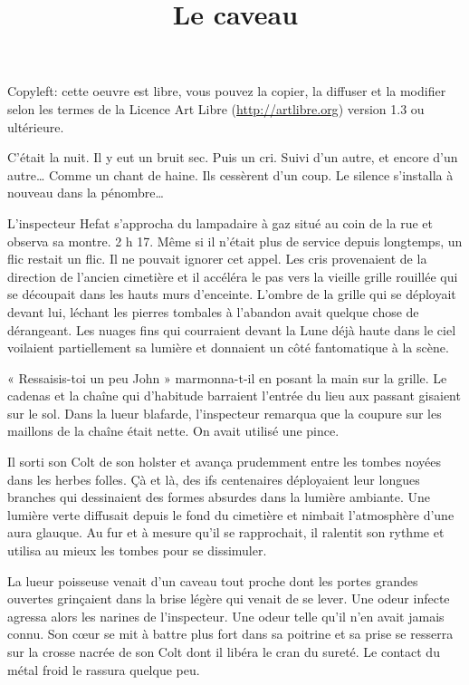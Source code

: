\documentclass[12pt,a4paper,oneside]{memoir}
\title{Le caveau}
\date{}
\begin{document}
\maketitle



\vspace{\baselineskip}
Copyleft: cette oeuvre est libre, vous pouvez la copier, la diffuser et la modifier selon les termes de la Licence Art 
Libre (\url{http://artlibre.org}) version 1.3 ou ultérieure.
\thispagestyle{empty}

\mainmatter
C'était la nuit. Il y eut un bruit sec. Puis un cri. Suivi d'un autre, et encore d'un autre… Comme un chant de haine. 
Ils cessèrent d'un coup. Le silence s'installa à nouveau dans la pénombre…

L'inspecteur Hefat s'approcha du lampadaire à gaz situé au coin de la rue et observa sa montre. 2 h 17. Même si il 
n'était plus de service depuis longtemps, un flic restait un flic. Il ne pouvait ignorer cet appel. Les cris 
provenaient de la direction de l'ancien cimetière et il accéléra le pas vers la vieille grille rouillée qui se 
découpait 
dans les hauts murs d'enceinte. L'ombre de la grille qui se déployait devant lui, léchant les pierres tombales à 
l'abandon avait quelque chose de dérangeant. Les nuages fins qui courraient devant la Lune déjà haute dans le ciel 
voilaient partiellement sa lumière et donnaient un côté fantomatique à la scène.

« Ressaisis-toi un peu John » marmonna-t-il en posant la main sur la grille. Le cadenas et la chaîne qui d'habitude 
barraient l'entrée du lieu aux passant gisaient sur le sol. Dans la lueur blafarde, l'inspecteur remarqua que la 
coupure sur les maillons de la chaîne était nette. On avait utilisé une pince.

Il sorti son Colt de son holster et avança prudemment entre les tombes noyées dans les herbes folles. Çà et là, des ifs 
centenaires déployaient leur longues branches qui dessinaient des formes absurdes dans la lumière ambiante. Une lumière 
verte diffusait depuis le fond du cimetière et nimbait l'atmosphère d'une aura glauque. Au fur et à mesure qu'il se 
rapprochait, il ralentit son rythme et utilisa au mieux les tombes pour se dissimuler.

La lueur poisseuse venait d'un caveau tout proche dont les portes grandes ouvertes grinçaient dans la brise légère qui 
venait de se lever. Une odeur infecte agressa alors les narines de l'inspecteur. Une odeur telle qu'il n'en avait 
jamais 
connu. Son cœur se mit à battre plus fort dans sa poitrine et sa prise se resserra sur la crosse nacrée de son Colt 
dont 
il libéra le cran du sureté. Le contact du métal froid le rassura quelque peu.
\end{document}
